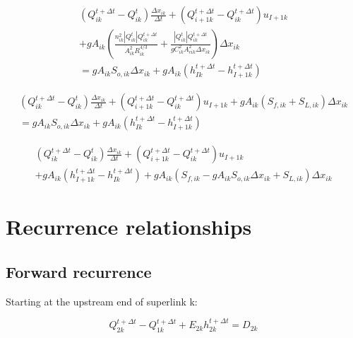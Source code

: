 \documentclass[11pt]{article}
\begin{document}
\begin{equation}
  \begin{split}
    (Q_{ik}^{t + \Delta t} - Q_{ik}^t) \frac{\Delta x_{ik}}{\Delta t} + (Q_{i+1k}^{t + \Delta t} - Q_{ik}^{t + \Delta t}) u_{I+1k} \\ + g A_{ik} (\frac{n_{ik}^2 |Q_{ik}^t| Q_{ik}^{t + \Delta t}}{A_{ik}^2 R_{ik}^{4/3}} + \frac{|Q_{ik}^t| Q_{ik}^{t + \Delta t}}{g C_{ik}^2 A_{cik}^2 \Delta x_{ik}}) \Delta x_{ik} \\ =
    g A_{ik} S_{o,ik} \Delta x_{ik} + g A_{ik} (h_{Ik}^{t + \Delta t} - h_{I+1k}^{t + \Delta t})
  \end{split}
\end{equation}


\begin{equation}
  \begin{split}
    (Q_{ik}^{t + \Delta t} - Q_{ik}^t) \frac{\Delta x_{ik}}{\Delta t} + (Q_{i+1k}^{t + \Delta t} - Q_{ik}^{t + \Delta t}) u_{I+1k} + g A_{ik} (S_{f,ik} + S_{L,ik}) \Delta x_{ik} \\ =
    g A_{ik} S_{o,ik} \Delta x_{ik} + g A_{ik} (h_{Ik}^{t + \Delta t} - h_{I+1k}^{t + \Delta t})
  \end{split}
\end{equation}

\begin{equation}
  \begin{split}
    (Q_{ik}^{t + \Delta t} - Q_{ik}^t) \frac{\Delta x_{ik}}{\Delta t} + (Q_{i+1k}^{t + \Delta t} - Q_{ik}^{t + \Delta t}) u_{I+1k} \\ + g A_{ik} (h_{I+1k}^{t + \Delta t} - h_{Ik}^{t + \Delta t}) + g A_{ik} (S_{f,ik} -
    g A_{ik} S_{o,ik} \Delta x_{ik} + S_{L,ik}) \Delta x_{ik}
  \end{split}
\end{equation}

\section{Recurrence relationships}

\subsection{Forward recurrence}

Starting at the upstream end of superlink k:

\begin{equation}
  Q_{2k}^{t + \Delta t} - Q_{1k}^{t + \Delta t} + E_{2k} h_{2k}^{t + \Delta t} = D_{2k}
\end{equation}
\end{document}
